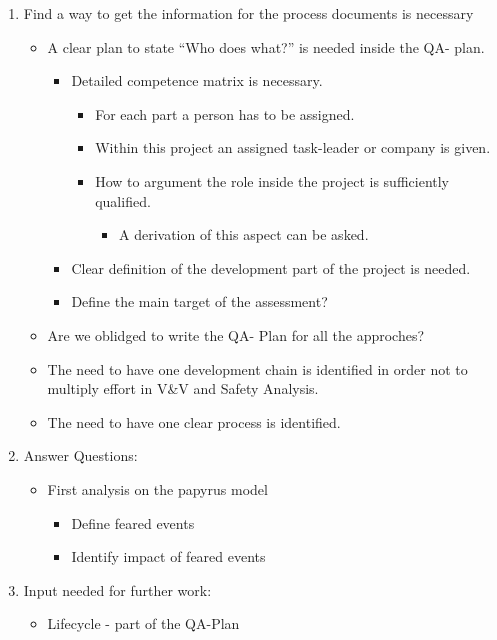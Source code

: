 \documentclass[a4paper,german]{article}
\begin{document}
\setcounter{tocdepth}{3}
\tableofcontents
\vspace*{1cm}
\begin{enumerate}
\item Find a way to get the information for the process documents is necessary
\begin{itemize}
\item A clear plan to state ``Who does what?'' is needed inside the QA- plan.
\begin{itemize}
\item Detailed competence matrix is necessary.
\begin{itemize}
\item For each part a person has to be assigned.
\item Within this project an assigned task-leader or company is given.
\item How to argument the role inside the project is sufficiently qualified.
\begin{itemize}
\item A derivation of this aspect can be asked.
\end{itemize}
\end{itemize}
\item Clear definition of the development part of the project is needed.
\item Define the main target of the assessment?
\end{itemize}
\item Are we oblidged to write the QA- Plan for all the approches?
\item The need to have one development chain is identified in order 
         not to multiply effort in V\&V and Safety Analysis.
\item The need to have one clear process is identified.
\end{itemize}
\item Answer Questions:
\begin{itemize}
\item First analysis on the papyrus model
\begin{itemize}
\item Define feared events
\item Identify impact of feared events
\end{itemize}
\end{itemize}
\item Input needed for further work:
\begin{itemize}
\item Lifecycle        - part of the QA-Plan

\end{itemize}
\end{enumerate}
\end{document}
